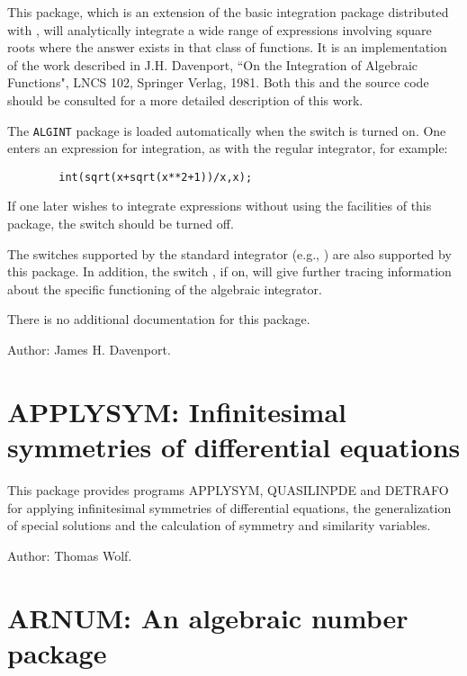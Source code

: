 This package, which is an extension of the basic integration package
distributed with {\REDUCE}, will analytically integrate a wide range of
expressions involving square roots where the answer exists in that class
of functions. It is an implementation of the work described in J.H.
Davenport, ``On the Integration of Algebraic Functions", LNCS 102,
Springer Verlag, 1981.  Both this and the source code should be consulted
for a more detailed description of this work.

\hypertarget{switch:ALGINT}{}
The \texttt{ALGINT} package is loaded automatically when the switch 
is turned on.  
One enters an expression for integration, as with the regular integrator,
for example:
\begin{verbatim}
        int(sqrt(x+sqrt(x**2+1))/x,x);
\end{verbatim}
If one later wishes to integrate expressions without using the facilities of
this package, the switch   should be turned
off. 

\hypertarget{switch:TRA}{}
The switches supported by the standard integrator (e.g., )
 are also supported by this package.  In addition, the
switch ,  if on, will give further tracing
information about the specific functioning of the algebraic integrator.

There is no additional documentation for this package.

Author: James H. Davenport.

\newpage

\section{APPLYSYM: Infinitesimal symmetries of differential equations}
\label{package:APPLYSYM}

This package provides programs APPLYSYM, QUASILINPDE and DETRAFO for
applying infinitesimal symmetries of differential equations, the
generalization of special solutions and the calculation of symmetry and
similarity variables.

Author: Thomas Wolf.



\newpage

\section{ARNUM: An algebraic number package} 
\label{sec:package-arnum}


